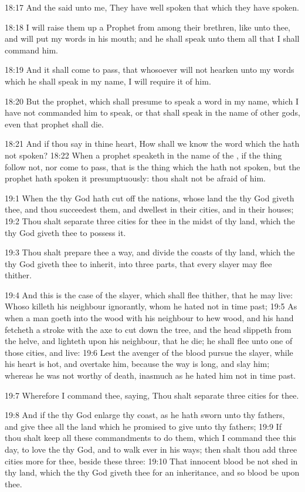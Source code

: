18:17 And the \LORD said unto me, They have well spoken that which they
have spoken.

18:18 I will raise them up a Prophet from among their brethren, like
unto thee, and will put my words in his mouth; and he shall speak unto
them all that I shall command him.

18:19 And it shall come to pass, that whosoever will not hearken unto
my words which he shall speak in my name, I will require it of him.

18:20 But the prophet, which shall presume to speak a word in my name,
which I have not commanded him to speak, or that shall speak in the
name of other gods, even that prophet shall die.

18:21 And if thou say in thine heart, How shall we know the word which
the \LORD hath not spoken?  18:22 When a prophet speaketh in the name
of the \LORD, if the thing follow not, nor come to pass, that is the
thing which the \LORD hath not spoken, but the prophet hath spoken it
presumptuously: thou shalt not be afraid of him.

19:1 When the \LORD thy God hath cut off the nations, whose land the
\LORD thy God giveth thee, and thou succeedest them, and dwellest in
their cities, and in their houses; 19:2 Thou shalt separate three
cities for thee in the midst of thy land, which the \LORD thy God
giveth thee to possess it.

19:3 Thou shalt prepare thee a way, and divide the coasts of thy land,
which the \LORD thy God giveth thee to inherit, into three parts, that
every slayer may flee thither.

19:4 And this is the case of the slayer, which shall flee thither,
that he may live: Whoso killeth his neighbour ignorantly, whom he
hated not in time past; 19:5 As when a man goeth into the wood with
his neighbour to hew wood, and his hand fetcheth a stroke with the axe
to cut down the tree, and the head slippeth from the helve, and
lighteth upon his neighbour, that he die; he shall flee unto one of
those cities, and live: 19:6 Lest the avenger of the blood pursue the
slayer, while his heart is hot, and overtake him, because the way is
long, and slay him; whereas he was not worthy of death, inasmuch as he
hated him not in time past.

19:7 Wherefore I command thee, saying, Thou shalt separate three
cities for thee.

19:8 And if the \LORD thy God enlarge thy coast, as he hath sworn unto
thy fathers, and give thee all the land which he promised to give unto
thy fathers; 19:9 If thou shalt keep all these commandments to do
them, which I command thee this day, to love the \LORD thy God, and to
walk ever in his ways; then shalt thou add three cities more for thee,
beside these three: 19:10 That innocent blood be not shed in thy land,
which the \LORD thy God giveth thee for an inheritance, and so blood be
upon thee.

